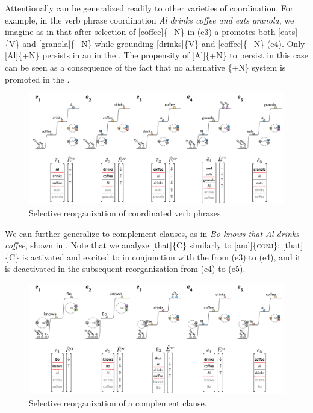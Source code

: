   Attentionally  can be generalized readily to other varieties of coordination. For example, in the verb phrase coordination \textit{Al drinks coffee and eats granola}, we imagine as in {} that after selection of [coffee]\{−N\} in (e3) a  promotes both [eats]\{V\} and [granola]\{−N\} while grounding [drinks]\{V\} and [coffee]\{−N\} (e4). Only [Al]\{+N\} persists in an  in the . The propensity of [Al]\{+N\} to persist in this case can be seen as a consequence of the fact that no alternative \{+N\} system is promoted in the .

  
\begin{figure}
\includegraphics[width=\textwidth]{figures/Tilsen-img100.png}
\caption{Selective reorganization of coordinated verb phrases.}
\label{fig:4:50}
\end{figure}
 

  We can further generalize  to complement clauses, as in \textit{Bo knows that Al drinks coffee}, shown in {}. Note that we analyze [that]\{C\} similarly to [and]\{\textsc{conj}\}: [that]\{C\} is activated and excited to  in conjunction with the  from (e3) to (e4), and it is deactivated in the subsequent reorganization from (e4) to (e5). 

  
\begin{figure}
\includegraphics[width=\textwidth]{figures/Tilsen-img101.png}
\caption{Selective reorganization of a complement clause.}
\label{fig:4:51}
\end{figure}
 

